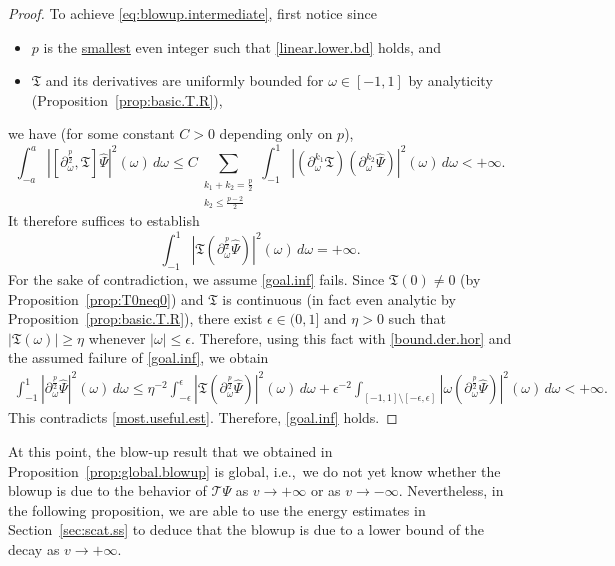 \documentclass[10pt, reqno]{amsart}
\theoremstyle{definition}
\theoremstyle{remark}
\numberwithin{equation}{section}
\newcommand{\ep}{\epsilon}
\newcommand{\rd}{\partial}
\newcommand{\0}{\emptyset}
\newcommand{\om}{\omega}
\newcommand{\f}{\frac}
\begin{document}
\begin{proof}
To achieve \eqref{eq:blowup.intermediate}, first notice since 
\begin{itemize}
\item $p$ is the \underline{smallest} even integer such that \eqref{linear.lower.bd} holds, and 
\item $\mathfrak T$ and its derivatives are uniformly bounded for $\om \in [-1,1]$ by analyticity (Proposition~\ref{prop:basic.T.R}), 
\end{itemize}
we have (for some constant $C>0$ depending only on $p$),
$$\int_{-a}^a \left|[\rd_\om^{\f{p}{2}},\mathfrak T]\widehat{\Psi}\right|^2 (\om)\, d\om \leq C\sum_{\substack{k_1+k_2=\f{p}{2}\\k_2\leq \f{p-2}{2}}}\int_{-1}^1 \left|(\rd_\om^{k_1}\mathfrak T)(\rd_\om^{k_2}\widehat{\Psi})\right|^2 (\om)\, d\om< +\infty.$$
It therefore suffices to establish
\begin{equation}\label{goal.inf}
\int_{-1}^1 \left|\mathfrak T(\rd_\om^{\f{p}{2}}\widehat{\Psi})\right|^2 (\om)\, d\om = +\infty.
\end{equation}
For the sake of contradiction, we assume \eqref{goal.inf} fails. Since $\mathfrak T(0)\neq 0$ (by Proposition~\ref{prop:T0neq0}) and $\mathfrak T$ is continuous (in fact even analytic by Proposition~\ref{prop:basic.T.R}), there exist $\ep \in (0,1]$ and $\eta>0$ such that $|\mathfrak T(\om)|\geq \eta$ whenever $|\om|\leq \ep$. Therefore, using this fact with \eqref{bound.der.hor} and the assumed failure of \eqref{goal.inf}, we obtain
\begin{equation*}
\begin{split}
\int_{-1}^1 \left|\rd_\om^{\f{p}{2}}\widehat{\Psi}\right|^2 (\om)\, d\om
\leq \eta^{-2}\int_{-\ep}^\ep \left|\mathfrak T(\rd_\om^{\f{p}{2}}\widehat{\Psi})\right|^2 (\om)\, d\om+\ep^{-2}\int_{[-1,1]\setminus [-\ep,\ep]} \left|\om(\rd_\om^{\f{p}{2}}\widehat{\Psi})\right|^2 (\om)\, d\om< +\infty.
\end{split}
\end{equation*}
This contradicts \eqref{most.useful.est}. Therefore, \eqref{goal.inf} holds.
\end{proof}

At this point, the blow-up result that we obtained in Proposition~\ref{prop:global.blowup} is global, i.e.,~we do not yet know whether the blowup is due to the behavior of $\mathcal T\Psi$ as $v\to +\infty$ or as $v\to -\infty$. Nevertheless, in the following proposition, we are able to use the energy estimates in Section~\ref{sec:scat.ss} to deduce that the blowup is due to a lower bound of the decay as $v\to +\infty$.
\end{document}
